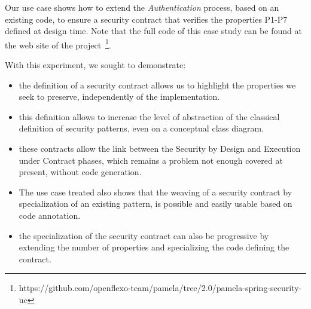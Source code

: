 Our use case shows how to extend the \textit{Authentication} process, based on an existing code, to ensure a security contract that verifies the properties P1-P7 defined at design time. Note that the full code of this case study can be found at the web site of the project~\footnote{https://github.com/openflexo-team/pamela/tree/2.0/pamela-spring-security-uc}.

With this experiment, we sought to demonstrate:
\begin{itemize}
    \item the definition of a security contract allows us to highlight the properties we seek to preserve, independently of the implementation.
    \item this definition allows to increase the level of abstraction of the classical definition of security patterns, even on a conceptual class diagram.
    \item these contracts allow the link between the Security by Design and Execution under Contract phases, which remains a problem not enough covered at present, without code generation.
    \item The use case treated also shows that the weaving of a security contract by specialization of an existing pattern, is possible and easily usable based on code annotation.
    \item the specialization of the security contract can also be progressive by extending the number of properties and specializing the code defining the contract. 
\end{itemize}

